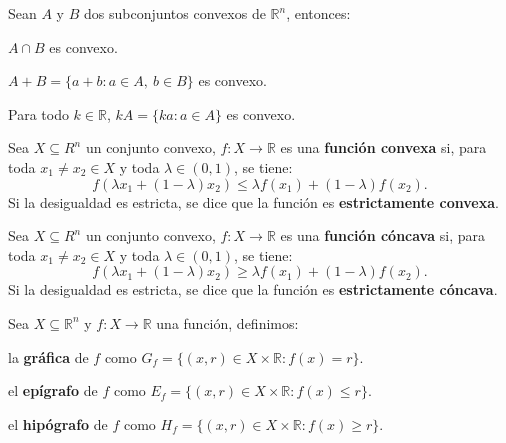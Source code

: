 \documentclass[8pt,a4paper]{extarticle}
\begin{document}
\begin{multicols}{3}
\begin{boxprop}
	Sean $A$ y $B$ dos subconjuntos convexos de $\mathbb{R}^n$, entonces:
	\begin{eqlist}
	\item $A \cap B$ es convexo.
	\item $A + B = \{a + b : a \in A,\ b \in B\}$ es convexo.
	\item Para todo $k \in \mathbb{R}$, $kA = \{ka : a\in A\}$ es convexo.
	\end{eqlist}
\end{boxprop}

\begin{boxdef}
	Sea $X \subseteq R^n$ un conjunto convexo, $f : X \to \mathbb{R}$ es una \textbf{función convexa} si, para toda $x_1 \neq x_2 \in X$ y toda $\lambda \in (0, 1)$, se tiene:
	\[
		f(\lambda x_1 + (1 - \lambda)x_2) \le \lambda f(x_1) + (1 - \lambda) f(x_2)
	.\] 
	Si la desigualdad es estricta, se dice que la función es \textbf{estrictamente convexa}.
\end{boxdef}

\begin{boxdef}                                                                                         
    Sea $X \subseteq R^n$ un conjunto convexo, $f : X \to \mathbb{R}$ es una \textbf{función cóncava} si, para toda $x_1 \neq x_2 \in X$ y toda $\lambda \in (0, 1)$, se tiene:
    \[                                                                                                                  
        f(\lambda x_1 + (1 - \lambda)x_2) \ge \lambda f(x_1) + (1 - \lambda) f(x_2)                                     
    .\]                                                                                                                 
    Si la desigualdad es estricta, se dice que la función es \textbf{estrictamente cóncava}.                            
\end{boxdef}

\begin{boxdef}
	Sea $X \subseteq \mathbb{R}^n$ y $f : X \to \mathbb{R}$ una función, definimos:
	\begin{bulletlist}
	\item la \textbf{gráfica} de $f$ como $G_f = \{ (x, r) \in X \times \mathbb{R} : f(x) = r \} $.
	\item el \textbf{epígrafo} de $f$ como $E_f = \{ (x, r) \in X \times \mathbb{R} : f(x) \le r \}$.
	\item el \textbf{hipógrafo} de $f$ como $H_f = \{ (x, r) \in X \times \mathbb{R} : f(x) \ge r \}$.
	\end{bulletlist}
\end{boxdef}


\end{multicols}
\end{document}
